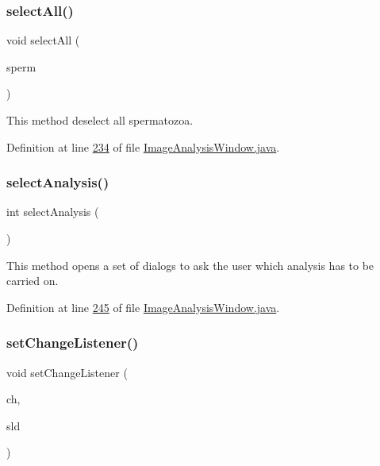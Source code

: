 \subsubsection{\texorpdfstring{select\+All()}{selectAll()}\hspace{0.1cm}{\footnotesize\ttfamily [2/2]}}
{\footnotesize\ttfamily void select\+All (\begin{DoxyParamCaption}\item[{List$<$ \hyperlink{classdata_1_1_spermatozoon}{Spermatozoon} $>$}]{sperm }\end{DoxyParamCaption})}

This method deselect all spermatozoa. 

Definition at line \hyperlink{_image_analysis_window_8java_source_l00234}{234} of file \hyperlink{_image_analysis_window_8java_source}{Image\+Analysis\+Window.\+java}.

\hypertarget{classgui_1_1_image_analysis_window_a0f3cd690d3cb4c7088975fa0ae8f747a}{}\label{classgui_1_1_image_analysis_window_a0f3cd690d3cb4c7088975fa0ae8f747a} 
\subsubsection{\texorpdfstring{select\+Analysis()}{selectAnalysis()}}
{\footnotesize\ttfamily int select\+Analysis (\begin{DoxyParamCaption}{ }\end{DoxyParamCaption})}

This method opens a set of dialogs to ask the user which analysis has to be carried on. 

Definition at line \hyperlink{_image_analysis_window_8java_source_l00245}{245} of file \hyperlink{_image_analysis_window_8java_source}{Image\+Analysis\+Window.\+java}.

\hypertarget{classgui_1_1_image_analysis_window_a8743638e7e3c13bddb254fe35d03cf2b}{}\label{classgui_1_1_image_analysis_window_a8743638e7e3c13bddb254fe35d03cf2b} 
\subsubsection{\texorpdfstring{set\+Change\+Listener()}{setChangeListener()}}
{\footnotesize\ttfamily void set\+Change\+Listener (\begin{DoxyParamCaption}\item[{Change\+Listener}]{ch,  }\item[{J\+Slider}]{sld }\end{DoxyParamCaption})}



